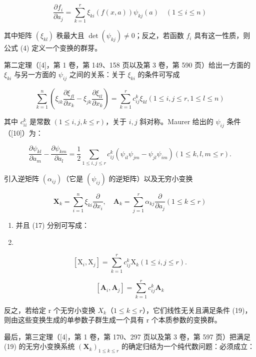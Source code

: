 \[
\frac {\partial f _ {i}}{\partial a _ {j}} = \sum_ {k = 1} ^ {r} \xi_ {k i} (f (x, a)) \psi_ {k j} (a) \quad (1 \leqslant i \leqslant n)\tag{15}
\]

其中矩阵 \((\xi_{kl})\) 秩最大且 \(\det(\psi_{kj}) \neq 0\)；反之，若函数 \(f_{i}\) 具有这一性质，则公式 (4) 定义一个变换的群芽。

第二定理（{[}4{]}，第 1 卷，第 149、158 页以及第 3 卷，第 590 页）给出一方面的 \(\xi_{ki}\) 与另一方面的 \(\psi_{ij}\) 之间的关系：关于 \(\xi_{ki}\) 的条件可写成

\[
\sum_ {k = 1} ^ {n} \left(\xi_ {i k} \frac {\partial \xi_ {f l}}{\partial x _ {k}} - \xi_ {j k} \frac {\partial \xi_ {t l}}{\partial x _ {k}}\right) = \sum_ {k = 1} ^ {r} c _ {i j} ^ {k} \xi_ {k l} (1 \leqslant i, j \leqslant r, 1 \leqslant l \leqslant n)\tag{16}
\]

其中 \(c_{ii}^{k}\) 是常数 \((1\leqslant i,j,k\leqslant r)\)，关于 \(i,j\) 斜对称。Maurer 给出的 \(\psi_{ij}\) 条件（{[}10{]}）为：

\[
\frac {\partial \psi_ {k l}}{\partial a _ {m}} - \frac {\partial \psi_ {k m}}{\partial a _ {l}} = \frac {1}{2} \sum_ {1 \leqslant i, j \leqslant r} c _ {i j} ^ {k} (\psi_ {i l} \psi_ {j m} - \psi_ {j l} \psi_ {i m}) (1 \leqslant k, l, m \leqslant r).\tag{17}
\]

引入逆矩阵 \((\alpha_{ij})\)（它是 \((\psi_{ij})\) 的逆矩阵）以及无穷小变换

\[
\mathbf {X} _ {k} = \sum_ {i = 1} ^ {n} \xi_ {k i} \frac {\partial}{\partial x _ {i}}, \quad \mathbf {A} _ {k} = \sum_ {j = 1} ^ {r} \alpha_ {k j} \frac {\partial}{\partial a _ {j}} (1 \leqslant k \leqslant r)\tag{18}
\]

\begin{enumerate}
\def\labelenumi{(\arabic{enumi})}
\setcounter{enumi}{15}
\item
  并且 (17) 分别可写成：
\item
\end{enumerate}

\[
[ \mathrm{X} _ {i}, \mathrm{X} _ {j} ] = \sum_ {k = 1} ^ {r} c _ {i j} ^ {k} \mathrm{X} _ {k} (1 \leqslant i, j \leqslant r).\tag{20}
\]

\[
[ \mathbf {A} _ {i}, \mathbf {A} _ {j} ] = \sum_ {k = 1} ^ {r} c _ {i j} ^ {k} \mathbf {A} _ {k}
\]

反之，若给定 r 个无穷小变换 \(X_{k}\)（\(1 \leqslant k \leqslant r\)），它们线性无关且满足条件 (19)，则由这些变换生成的单参数子群生成一个具有 r 个本质参数的变换群。

最后，第三定理（{[}4{]}，第 1 卷，第 170、297 页以及第 3 卷，第 597 页）把满足 (19) 的无穷小变换系统 \((\mathbf{X}_k)_{1 \leqslant k \leqslant r}\) 的确定归结为一个纯代数问题：必须成立：

